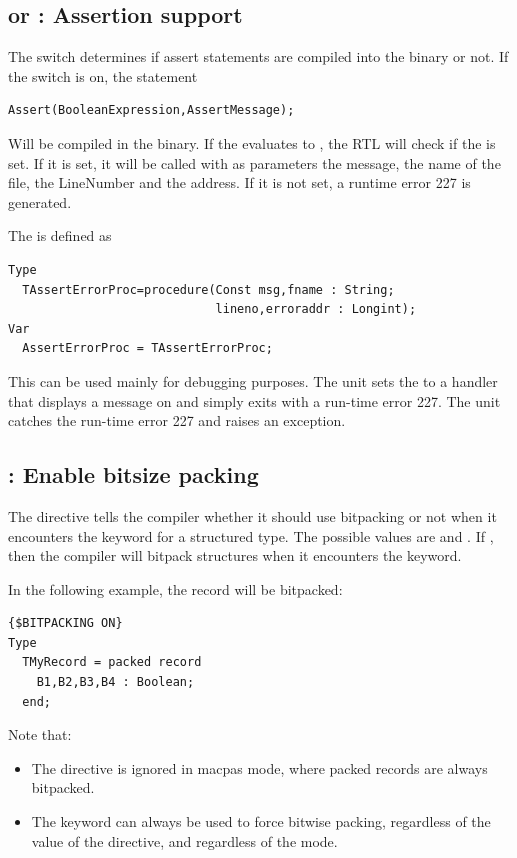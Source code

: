 \subsection{ or  : Assertion support}

The  switch determines if assert statements are
compiled into the binary or not. If the switch is on, the statement
\begin{verbatim}
Assert(BooleanExpression,AssertMessage);
\end{verbatim}
Will be compiled in the binary. If the  evaluates to
, the RTL will check if the  is set. If it
is set, it will be called with as parameters the 
message, the name of the file, the LineNumber and the address. If it is not
set, a runtime error 227 is generated.

The  is defined as
\begin{verbatim}
Type
  TAssertErrorProc=procedure(Const msg,fname : String;
                             lineno,erroraddr : Longint);
Var
  AssertErrorProc = TAssertErrorProc;
\end{verbatim}
This can be used mainly for debugging purposes. The  unit sets the
 to a handler that displays a message on 
and simply exits with a run-time error 227. The  unit catches the run-time error 227
and raises an  exception.

\subsection{ : Enable bitsize packing}
\label{se:dirbitpacking}
The  directive tells the compiler whether
it should use bitpacking or not when it encounters the 
keyword for a structured type. The possible values are  and
. If , then the compiler will bitpack structures when it
encounters the  keyword.

In the following example, the  record will be bitpacked:
\begin{verbatim}
{$BITPACKING ON}
Type
  TMyRecord = packed record
    B1,B2,B3,B4 : Boolean;
  end;
\end{verbatim}

Note that:
\begin{itemize}
\item The  directive is ignored in macpas mode, where
packed records are always bitpacked.
\item The  keyword can always be used to force bitwise
packing, regardless of the value of the  directive, and
regardless of the mode.
\end{itemize}

